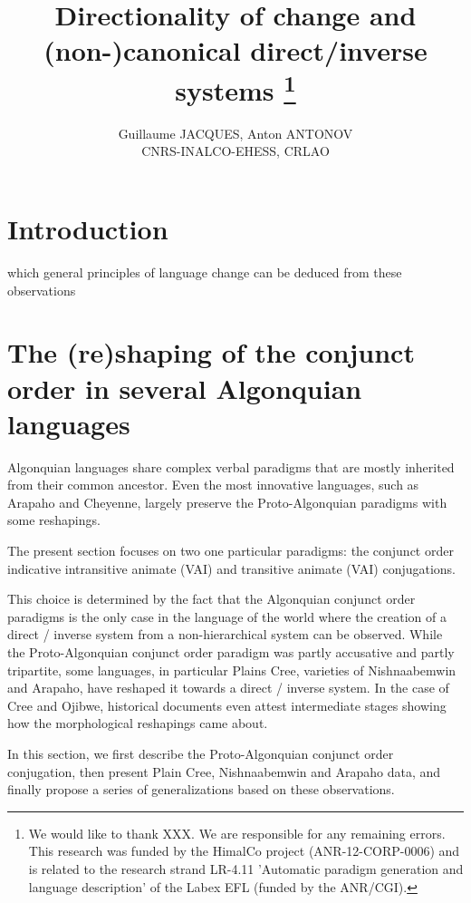 \documentclass[twoside,a4paper,11pt]{article}
\newcommand{\Σ}{\greek{Σ}}
\begin{document}
\linenumbers
\title{Directionality of change and   (non-)canonical direct/inverse systems \footnote{We would like to thank XXX. We are responsible for any remaining errors. This research was funded by the HimalCo project (ANR-12-CORP-0006) and is related to the research strand LR-4.11 'Automatic paradigm generation and language description' of the Labex EFL (funded by the ANR/CGI). } }

\author{Guillaume JACQUES, Anton ANTONOV\\ CNRS-INALCO-EHESS, CRLAO}
\maketitle
\section{Introduction}

which general principles of language change can be deduced from these observations


\section{The (re)shaping of the conjunct order in several Algonquian languages }
Algonquian languages share complex verbal paradigms that are mostly inherited from their common ancestor. Even the most innovative languages, such as Arapaho and Cheyenne, largely preserve the Proto-Algonquian paradigms with some reshapings.

The present section focuses on two one particular paradigms: the conjunct order indicative intransitive animate (VAI) and transitive animate (VAI) conjugations. 

This choice is determined by the fact that the Algonquian conjunct order paradigms is the only case in the language of the world where the creation of a direct / inverse system from a non-hierarchical   system can be observed. While the Proto-Algonquian conjunct order paradigm was partly accusative and partly tripartite, some languages, in particular Plains Cree, varieties of Nishnaabemwin and Arapaho, have reshaped it towards a direct / inverse system. In the case of Cree and Ojibwe, historical documents even attest intermediate stages showing how the morphological reshapings came about.

In this section, we first describe the Proto-Algonquian conjunct order conjugation, then present Plain Cree, Nishnaabemwin and Arapaho data, and finally propose a series of generalizations based on these observations.
\end{document}
